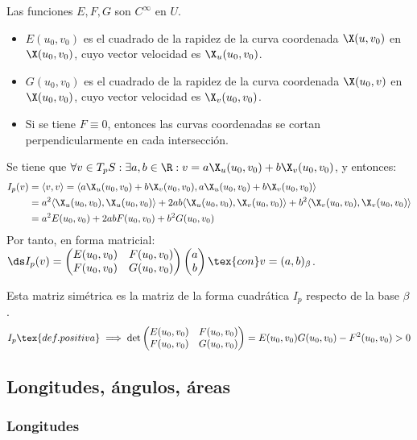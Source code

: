 Las funciones $E, F, G$ son $C^\infty$ en $U$.
\begin{itemize}
	\item $E(u_0, v_0)$ es el cuadrado de la rapidez de la curva coordenada $\X(u, v_0)$ en $\X(u_0, v_0)$, cuyo vector velocidad es $\X_u(u_0, v_0)$.
	\item $G(u_0, v_0)$ es el cuadrado de la rapidez de la curva coordenada $\X(u_0, v)$ en $\X(u_0, v_0)$, cuyo vector velocidad es $\X_v(u_0, v_0)$.
	\item Si se tiene $F\equiv 0$, entonces las curvas coordenadas se cortan perpendicularmente en cada intersección.
\end{itemize}
Se tiene que $\forall v \in T_pS : \exists a, b \in \R : v = a\X_u(u_0, v_0) + b\X_v(u_0, v_0)$, y entonces:
\[
	\begin{aligned}
		I_p(v) & = \langle v, v \rangle = \langle a\X_u(u_0, v_0) + b\X_v(u_0, v_0), a\X_u(u_0, v_0) + b\X_v(u_0, v_0) \rangle                                               \\
		       & = a^2\langle \X_u(u_0, v_0), \X_u(u_0, v_0) \rangle + 2ab\langle \X_u(u_0, v_0), \X_v(u_0, v_0) \rangle + b^2\langle \X_v(u_0, v_0), \X_v(u_0, v_0) \rangle \\
		       & = a^2E(u_0, v_0) + 2abF(u_0, v_0) + b^2G(u_0, v_0)
	\end{aligned}\]
Por tanto, en forma matricial: $\ds I_p(v) = \begin{pmatrix}
		E(u_0, v_0) & F(u_0, v_0) \\
		F(u_0, v_0) & G(u_0, v_0)
	\end{pmatrix}\begin{pmatrix}a\\b\end{pmatrix} \tex{ con } v = (a, b)_{\beta}$.

Esta matriz simétrica es la matriz de la forma cuadrática $I_p$ respecto de la base $\beta$.
\[I_p \tex{ def. positiva } \implies \det{\begin{pmatrix}
			E(u_0, v_0) & F(u_0, v_0) \\
			F(u_0, v_0) & G(u_0, v_0)
		\end{pmatrix}} = E(u_0, v_0)G(u_0, v_0) - F^2(u_0, v_0) > 0\]

\subsection{Longitudes, ángulos, áreas}

\subsubsection{Longitudes}

